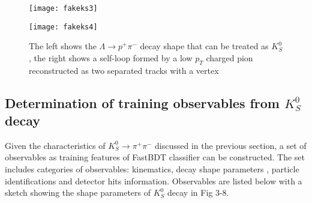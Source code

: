 \begin{figure}[htbp]
	\begin{minipage}[t]{0.5\linewidth} %
		\centering 
		\texttt{[image: fakeks3]} 
		\label{fig:side:a} 
	\end{minipage}%
	\begin{minipage}[t]{0.5\linewidth} 
		\centering 
		\texttt{[image: fakeks4]} 
		\label{fig:side:b} 
	\end{minipage}%
	
	\caption{The left shows the $\Lambda \to p^+ \pi^-$ decay shape that can be treated as $K_S^0$, the right shows a self-loop formed by a low $p_T$ charged pion reconstructed as two separated tracks with a vertex}
\end{figure}

\subsection{Determination of training observables from $K_S^0$ decay }
Given the characteristics of  $K_S^0 \to \pi^+ \pi^-$ discussed in the previous section, a set of observables as training features of FastBDT classifier can be constructed. The set includes categories of observables: kinematics, decay shape parameters , particle identifications and detector hits information. Observables are listed below with a sketch showing the shape parameters of $K_S^0$ decay in Fig 3-8. 

